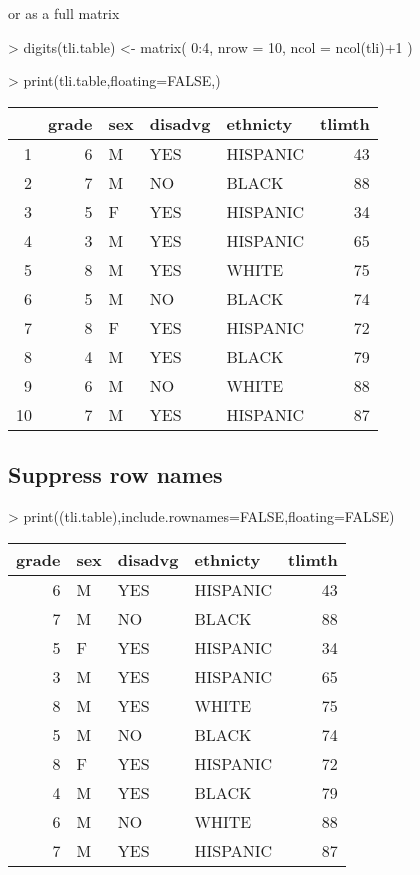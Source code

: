 \documentclass[letterpaper]{article}
\begin{document}
or as a full matrix
\begin{Schunk}
\begin{Sinput}
> digits(tli.table) <- matrix( 0:4, nrow = 10, ncol = ncol(tli)+1 )
\end{Sinput}
\end{Schunk}
\begin{Schunk}
\begin{Sinput}
> print(tli.table,floating=FALSE,)
\end{Sinput}
% latex table generated in R 3.1.1 by xtable 1.7-3 package
% 
\begin{tabular}{|rr|lp{3cm}l|r|}
  \hline
 & grade & sex & disadvg & ethnicty & tlimth \\ 
  \hline
1 & 6 & M & YES & HISPANIC & 43 \\ 
  2 &  7 & M & NO & BLACK & 88 \\ 
  3 &   5 & F & YES & HISPANIC &  34 \\ 
  4 &    3 & M & YES & HISPANIC &   65 \\ 
  5 &     8 & M & YES & WHITE &    75 \\ 
  6 & 5 & M & NO & BLACK & 74 \\ 
  7 &  8 & F & YES & HISPANIC & 72 \\ 
  8 &   4 & M & YES & BLACK &  79 \\ 
  9 &    6 & M & NO & WHITE &   88 \\ 
  10 &     7 & M & YES & HISPANIC &    87 \\ 
   \hline
\end{tabular}\end{Schunk}

\subsection{Suppress row names}
\begin{Schunk}
\begin{Sinput}
> print((tli.table),include.rownames=FALSE,floating=FALSE)
\end{Sinput}
% latex table generated in R 3.1.1 by xtable 1.7-3 package
% 
\begin{tabular}{r|lp{3cm}l|r|}
  \hline
grade & sex & disadvg & ethnicty & tlimth \\ 
  \hline
6 & M & YES & HISPANIC & 43 \\ 
   7 & M & NO & BLACK & 88 \\ 
    5 & F & YES & HISPANIC &  34 \\ 
     3 & M & YES & HISPANIC &   65 \\ 
      8 & M & YES & WHITE &    75 \\ 
  5 & M & NO & BLACK & 74 \\ 
   8 & F & YES & HISPANIC & 72 \\ 
    4 & M & YES & BLACK &  79 \\ 
     6 & M & NO & WHITE &   88 \\ 
      7 & M & YES & HISPANIC &    87 \\ 
   \hline
\end{tabular}\end{Schunk}
\end{document}
